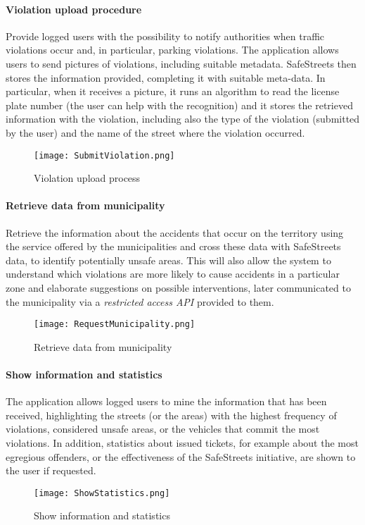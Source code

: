 \paragraph{Violation upload procedure} 
Provide logged users with the possibility to notify authorities when traffic violations occur and, in particular, parking violations. The application allows users to send pictures of violations, including suitable metadata.
SafeStreets then stores the information provided, completing it with suitable meta-­data. In particular, when it receives a picture, it runs an algorithm to read the license plate number (the user can help with the recognition) and it stores the retrieved information with the violation, including also the type of the violation (submitted by the user) and the name of the street where the violation occurred.
	\newline\newline
	\begin{figure}[h]
		\centering
		\texttt{[image: SubmitViolation.png]}
		\caption{
			\label{fig:violationUpload} Violation upload process
		}
	\end{figure}
	\newline\newline
\paragraph{Retrieve data from municipality}
Retrieve the information about the accidents that occur on the territory using the service offered by the municipalities and cross these data with SafeStreets data, to identify potentially unsafe areas. This will also allow the system to understand which violations are more likely to cause accidents in a particular zone and elaborate suggestions on possible interventions, later communicated to the municipality via a \emph{restricted access API} provided to them.
	\pagebreak
	\newline
	\begin{figure}[h]
		\centering
		\texttt{[image: RequestMunicipality.png]}
		\caption{
			\label{fig:retrieveMunicipality} Retrieve data from municipality
		}
	\end{figure}
\newline
\paragraph{Show information and statistics}
The application allows logged users to mine the information that has been received, highlighting the streets (or the areas) with the highest frequency of violations, considered unsafe areas, or the vehicles that commit the most violations. In addition, statistics about issued tickets, for example about the most egregious offenders, or the effectiveness of the SafeStreets initiative, are shown to the user if requested. 
	\newline\newline
	\begin{figure}[h]
		\centering
		\texttt{[image: ShowStatistics.png]}
		\caption{
			\label{fig:showStatistics} Show information and statistics
		}
	\end{figure}
	\pagebreak
